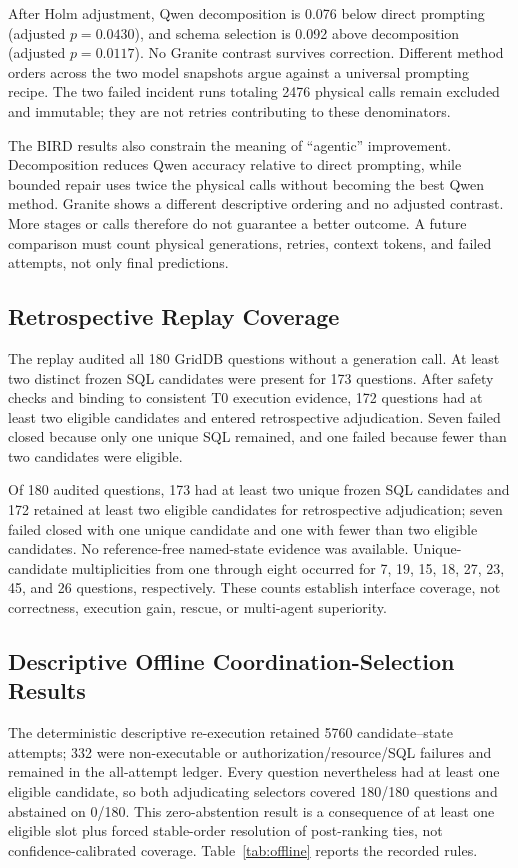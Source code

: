 \documentclass[applsci,article,submit,moreauthors]{Definitions/mdpi}
\begin{document}
After Holm adjustment, Qwen decomposition is 0.076 below direct prompting (adjusted $p=0.0430$), and schema selection is 0.092 above decomposition (adjusted $p=0.0117$). No Granite contrast survives correction. Different method orders across the two model snapshots argue against a universal prompting recipe. The two failed incident runs totaling 2476 physical calls remain excluded and immutable; they are not retries contributing to these denominators.

The BIRD results also constrain the meaning of ``agentic'' improvement. Decomposition reduces Qwen accuracy relative to direct prompting, while bounded repair uses twice the physical calls without becoming the best Qwen method. Granite shows a different descriptive ordering and no adjusted contrast. More stages or calls therefore do not guarantee a better outcome. A future comparison must count physical generations, retries, context tokens, and failed attempts, not only final predictions.

\subsection{Retrospective Replay Coverage}

The replay audited all 180 GridDB questions without a generation call. At least two distinct frozen SQL candidates were present for 173 questions. After safety checks and binding to consistent T0 execution evidence, 172 questions had at least two eligible candidates and entered retrospective adjudication. Seven failed closed because only one unique SQL remained, and one failed because fewer than two candidates were eligible.

Of 180 audited questions, 173 had at least two unique frozen SQL candidates and 172 retained at least two eligible candidates for retrospective adjudication; seven failed closed with one unique candidate and one with fewer than two eligible candidates. No reference-free named-state evidence was available. Unique-candidate multiplicities from one through eight occurred for 7, 19, 15, 18, 27, 23, 45, and 26 questions, respectively. These counts establish interface coverage, not correctness, execution gain, rescue, or multi-agent superiority.

\subsection{Descriptive Offline Coordination-Selection Results}

The deterministic descriptive re-execution retained 5760 candidate--state attempts; 332 were non-executable or authorization/resource/SQL failures and remained in the all-attempt ledger. Every question nevertheless had at least one eligible candidate, so both adjudicating selectors covered 180/180 questions and abstained on 0/180. This zero-abstention result is a consequence of at least one eligible slot plus forced stable-order resolution of post-ranking ties, not confidence-calibrated coverage. Table~\ref{tab:offline} reports the recorded rules.
\end{document}
